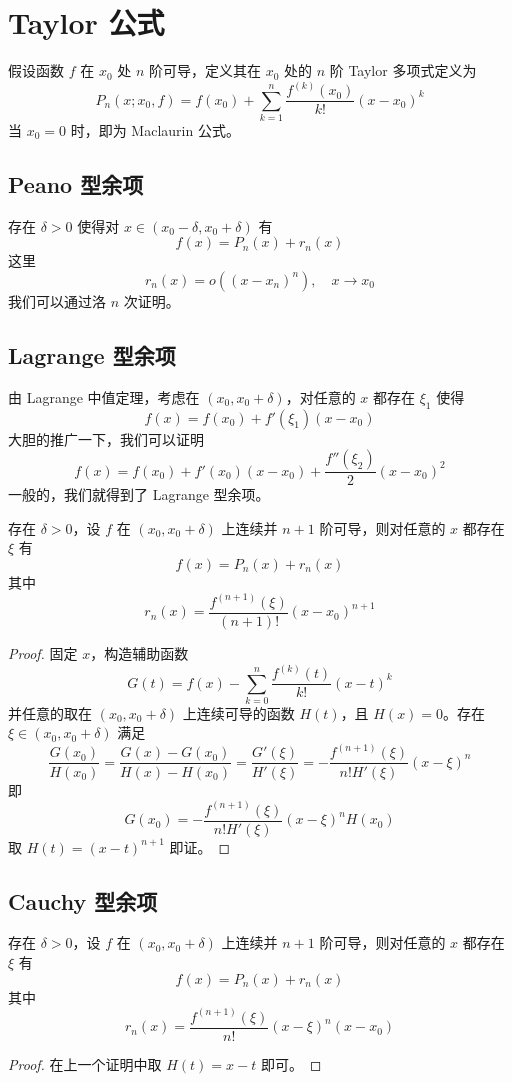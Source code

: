 \section{Taylor 公式}

假设函数 $f$ 在 $x_0$ 处 $n$ 阶可导，定义其在 $x_0$ 处的 $n$ 阶 Taylor 多项式定义为
\[ P_n(x;x_0, f) = f(x_0) + \sum_{k=1}^{n} \frac{f^{(k)}(x_0)}{k!} (x-x_0)^k \]
当 $x_0 = 0$ 时，即为 Maclaurin 公式。

\subsection{Peano 型余项}
存在 $\delta > 0$ 使得对 $x \in (x_0 - \delta, x_0 + \delta)$ 有
\[ f(x) = P_n(x) + r_n(x) \]
这里
\[ r_n(x) = o((x-x_n)^n), \quad x \to x_0 \]
我们可以通过洛 $n$ 次证明。

\subsection{Lagrange 型余项}
由 Lagrange 中值定理，考虑在 $(x_0, x_0 + \delta)$，对任意的 $x$ 都存在 $\xi_1$ 使得
\[ f(x) = f(x_0) + f'(\xi_1)(x-x_0) \]
大胆的推广一下，我们可以证明
\[ f(x) = f(x_0) + f'(x_0)(x-x_0) + \frac{f''(\xi_2)}{2}(x-x_0)^2 \]
一般的，我们就得到了 Lagrange 型余项。

\begin{theorem}
	存在 $\delta > 0$，设 $f$ 在 $(x_0, x_0+\delta)$ 上连续并 $n + 1$ 阶可导，则对任意的 $x$ 都存在 $\xi$ 有
	\[ f(x) = P_n(x) + r_n(x) \]
	其中
	\[ r_n(x) = \frac{f^{(n+1)}(\xi)}{(n+1)!}(x-x_0)^{n+1} \]
\end{theorem}

\begin{proof}
	固定 $x$，构造辅助函数
	\[ G(t) = f(x) - \sum_{k=0}^n \frac{f^{(k)}(t)}{k!} (x-t)^k \]
	并任意的取在 $(x_0, x_0 + \delta)$ 上连续可导的函数 $H(t)$，且 $H(x) = 0$。存在 $\xi \in (x_0, x_0 + \delta)$ 满足
	\[ \frac{G(x_0)}{H(x_0)} = \frac{G(x) - G(x_0)}{H(x) - H(x_0)} = \frac{G'(\xi)}{H'(\xi)} = -\frac{f^{(n+1)}(\xi)}{n!H'(\xi)}(x-\xi)^n \]
	即
	\[ G(x_0) = -\frac{f^{(n+1)}(\xi)}{n! H'(\xi)}(x-\xi)^nH(x_0) \]
	取 $H(t) = (x-t)^{n+1}$ 即证。
\end{proof}

\subsection{Cauchy 型余项}

\begin{theorem}
	存在 $\delta > 0$，设 $f$ 在 $(x_0, x_0+\delta)$ 上连续并 $n + 1$ 阶可导，则对任意的 $x$ 都存在 $\xi$ 有
	\[ f(x) = P_n(x) + r_n(x) \]
	其中
	\[ r_n(x) = \frac{f^{(n+1)}(\xi)}{n!}(x-\xi)^n(x-x_0) \]
\end{theorem}

\begin{proof}
	在上一个证明中取 $H(t) = x - t$ 即可。
\end{proof}


